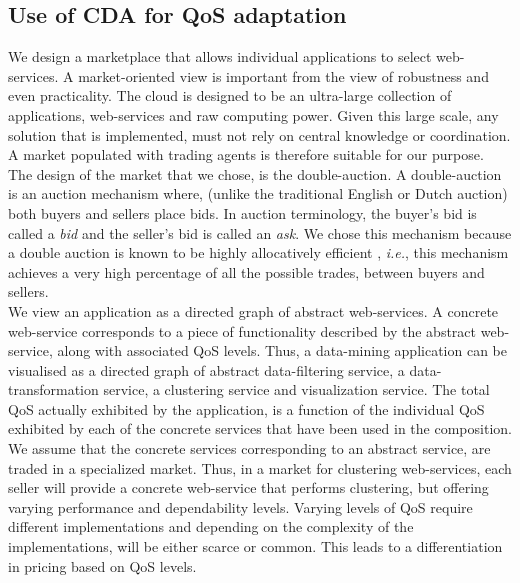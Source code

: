 \documentclass[10pt,journal,compsoc]{IEEEtran}
\begin{document}

\subsection{Use of CDA for QoS adaptation}
We design a marketplace that allows individual applications to select web-services. A market-oriented view is important from the view of robustness and even practicality. The cloud is designed to be an ultra-large collection of applications, web-services and raw computing power. Given this large scale, any solution that is implemented, must not rely on central knowledge or coordination. A market populated with trading agents is therefore suitable for our purpose. The design of the market that we chose, is the double-auction. A double-auction is an auction mechanism where, (unlike the traditional English or Dutch auction) both buyers and sellers place bids. In auction terminology, the buyer's bid is called a \textit{bid} and the seller's bid is called an \textit{ask}. We chose this mechanism because a double auction is known to be highly allocatively efficient \cite{Gode1993Allocative}, \textit{i.e.}, this mechanism achieves a very high percentage of all the possible trades, between buyers and sellers. 
\\
We view an application as a directed graph of abstract web-services. A concrete web-service corresponds to a piece of functionality described by the abstract web-service, along with associated QoS levels. Thus, a data-mining application can be visualised as a directed graph of abstract data-filtering service, a data-transformation service, a clustering service and visualization service. The total QoS actually exhibited by the application, is a function of the individual QoS exhibited by each of the concrete services that have been used in the composition. We assume that the concrete services corresponding to an abstract service, are traded in a specialized market. %
Thus, in a market for clustering web-services, each seller will provide a concrete web-service that performs clustering, but offering varying performance and dependability levels. Varying levels of QoS require different implementations and depending on the complexity of the implementations, will be either scarce or common. This leads to a differentiation in pricing based on QoS levels. 
\end{document}
